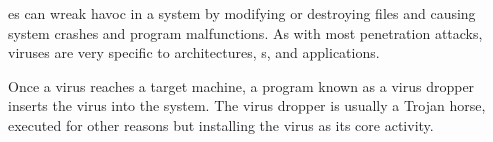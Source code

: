 es can wreak havoc in a system by modifying or destroying files and causing system crashes and program malfunctions.
As with most penetration attacks, viruses are very specific to architectures, s, and applications.

Once a virus reaches a target machine, a program known as a virus dropper inserts the virus into the system.
The virus dropper is usually a Trojan horse, executed for other reasons but installing the virus as its core activity.

